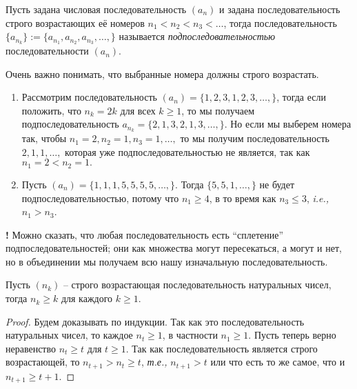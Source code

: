\begin{definition}
    Пусть задана числовая последовательность $(a_n)$
    и задана последовательность строго возрастающих её номеров $n_1 <n_2< n_3 < \ldots$, тогда последовательность $\{a_{n_k}\}:= \{a_{n_1}, a_{n_2}, a_{n_3},\ldots,\}$ называется \textit{подпоследовательностью} последовательности $(a_n).$
\end{definition}

\begin{example}
    Очень важно понимать, что выбранные номера должны строго возрастать.
     \begin{enumerate}
         \item Рассмотрим последовательность $(a_n)=\{1,2,3,1,2,3,\ldots,\}$, тогда если положить, что $n_k = 2k$ для всех $k\ge 1$, то мы получаем подпоследовательность $a_{n_k} = \{2,1,3,2,1,3, \ldots,\}$. Но если мы выберем номера так, чтобы $n_1= 2, n_2 = 1, n_3=1, \ldots,$ то мы получим последовательность $2,1,1,\ldots,$ которая уже подпоследовательностью не является, так как $n_1 = 2 <n_2 = 1.$

         \item Пусть $(a_n) = \{1,1,1,5,5,5,5,\ldots,\}.$ Тогда $\{5,5,1,\ldots,\}$ не будет подпоследовательностью, потому что $n_1 \ge 4$, в то время как $n_3 \le 3$, \textit{i.e.,} $n_1 >n_3$. 
     \end{enumerate}
\end{example}

\begin{mydanger}{\bf{!}}
    Можно сказать, что любая последовательность есть ``сплетение'' подпоследовательностей; они как множества могут пересекаться, а могут и нет, но в объединении мы получаем всю нашу изначальную последовательность.
\end{mydanger}

\begin{lemma}\label{n_k>=k}
    Пусть $ (n_k )$ -- строго возрастающая последовательность натуральных чисел, тогда $n_k \ge k$ для каждого $k\ge 1.$
\end{lemma}
\begin{proof}
    Будем доказывать по индукции. Так как это последовательность натуральных чисел, то каждое $n_t\ge 1$, в частности $n_1\ge 1$. Пусть теперь верно неравенство $n_t \ge t$ для $t\ge 1$. Так как последовательность является строго возрастающей, то $n_{t+1}>n_t \ge t$, \textit{т.е.,} $n_{t+1} >t$ или что есть то же самое, что и $n_{t+1}\ge t+1$.
\end{proof}

